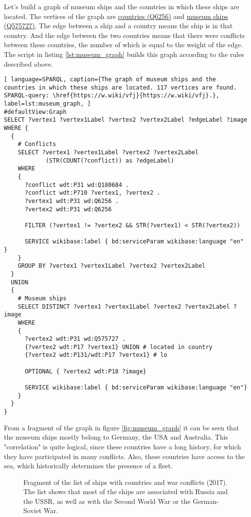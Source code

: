 Let's build a graph of museum ships and the countries in which these ships are located. The vertices of the graph are \href{https://www.wikidata.org/wiki/Q6256}{countries (Q6256)} and \href{https://www.wikidata.org/wiki/Q575727}{museum ships (Q575727)}. The edge between a ship and a country means the ship is in that country. And the edge between the two countries means that there were conflicts between these countries, the number of which is equal to the weight of the edge. The script in listing \ref{lst:museum_graph} builds this graph according to the rules described above.

\begin{lstlisting}[ language=SPARQL, caption={The graph of museum ships and the countries in which these ships are located. 117 vertices are found. SPARQL-query: \href{https://w.wiki/vfj}{https://w.wiki/vfj}.}, label=lst:museum_graph, ]
#defaultView:Graph    
SELECT ?vertex1 ?vertex1Label ?vertex2 ?vertex2Label ?edgeLabel ?image 
WHERE {
  {
    # Conflicts
    SELECT ?vertex1 ?vertex1Label ?vertex2 ?vertex2Label 
            (STR(COUNT(?conflict)) as ?edgeLabel) 
    WHERE
    {
      ?conflict wdt:P31 wd:Q180684 .
      ?conflict wdt:P710 ?vertex1, ?vertex2 .
      ?vertex1 wdt:P31 wd:Q6256 . 
      ?vertex2 wdt:P31 wd:Q6256
  
      FILTER (?vertex1 != ?vertex2 && STR(?vertex1) < STR(?vertex2))
    
      SERVICE wikibase:label { bd:serviceParam wikibase:language "en" }
    }
    GROUP BY ?vertex1 ?vertex1Label ?vertex2 ?vertex2Label
  }
  UNION
  {
    # Museum ships
    SELECT DISTINCT ?vertex1 ?vertex1Label ?vertex2 ?vertex2Label ?image
    WHERE
    {
      ?vertex2 wdt:P31 wd:Q575727 .
      {?vertex2 wdt:P17 ?vertex1} UNION # located in country
      {?vertex2 wdt:P131/wdt:P17 ?vertex1} # lo
          
      OPTIONAL { ?vertex2 wdt:P18 ?image}
          
      SERVICE wikibase:label { bd:serviceParam wikibase:language "en"}
    }
  }
}
\end{lstlisting}

From a fragment of the graph in figure \ref{fig:museum_graph} it can be seen that the museum ships mostly belong to Germany, the USA and Australia. This "correlation" is quite logical, since these countries have a long history, for which they have participated in many conflicts. Also, these countries have access to the sea, which historically determines the presence of a fleet.

\begin{figure*}[ht]
  {
  \setlength{\fboxsep}{0pt}%
  \setlength{\fboxrule}{1pt}%
  }
    \caption[List of ships with countries and war conflicts]{Fragment of the list of ships with countries and war conflicts (2017). The list shows that most of the ships are associated with Russia and the USSR, as well as with the Second World War or the German-Soviet War.}%
    \label{fig:ships_by_country_and_conflict}%
\end{figure*}
